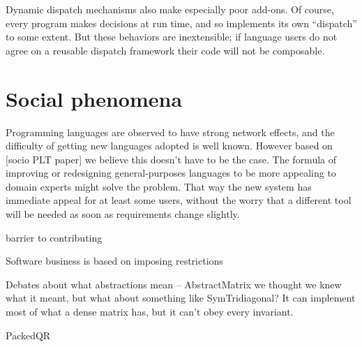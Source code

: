 Dynamic dispatch mechanisms also make especially poor add-ons. Of course,
every program makes decisions at run time, and so implements its own
``dispatch'' to some extent. But these behaviors are inextensible; if
language users do not agree on a reusable dispatch framework their code
will not be composable.


\section{Social phenomena}

Programming languages are observed to have strong network effects, and the
difficulty of getting new languages adopted is well known. However based on
[socio PLT paper] we believe this doesn't have to be the case. The formula
of improving or redesigning general-purposes languages to be more appealing to
domain experts might solve the problem. That way the new system has immediate
appeal for at least some users, without the worry that a different tool will
be needed as soon as requirements change slightly.

barrier to contributing

Software business is based on imposing restrictions


Debates about what abstractions mean -- AbstractMatrix
we thought we knew what it meant, but what about something like
SymTridiagonal? It can implement most of what a dense matrix
has, but it can't obey every invariant.

PackedQR
